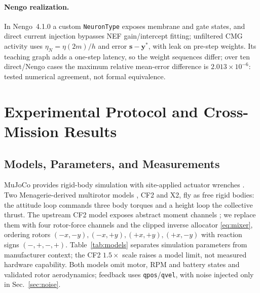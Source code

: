 \documentclass[letterpaper, 10 pt, conference]{ieeeconf}
\begin{document}
\paragraph{Nengo realization.}
In Nengo~4.1.0 a custom \texttt{NeuronType} exposes membrane and gate states, and direct current injection bypasses NEF gain/intercept fitting; unfiltered CMG activity uses $\eta_N=\eta(2m)/h$ and error $\bm s-\bm y^*$, with leak on pre-step weights. Its teaching graph adds a one-step latency, so the weight sequences differ; over ten direct/Nengo cases the maximum relative mean-error difference is $2.013\times10^{-6}$: tested numerical agreement, not formal equivalence.

\section{Experimental Protocol and Cross-Mission Results}
\label{sec:results}
\subsection{Models, Parameters, and Measurements}

MuJoCo provides rigid-body simulation with site-applied actuator wrenches
\cite{todorov2012mujoco}. Two Menagerie-derived multirotor models \cite{menagerieModels},
CF2 and X2, fly as free rigid bodies: the attitude loop commands three body torques and a
height loop the collective thrust. The upstream CF2 model exposes abstract moment channels
\cite{menagerieCF2}; we replace them with four rotor-force channels and the clipped inverse
allocator \eqref{eq:mixer}, ordering rotors $(-x,-y),(-x,+y),(+x,+y),(+x,-y)$ with reaction
signs $(-,+,-,+)$. Table~\ref{tab:models} separates simulation parameters from manufacturer
context; the CF2 $1.5\times$ scale raises a model limit, not measured hardware capability.
Both models omit motor, RPM and battery states and validated rotor aerodynamics; feedback
uses \texttt{qpos}/\texttt{qvel}, with noise injected only in Sec.~\ref{sec:noise}.
\end{document}
